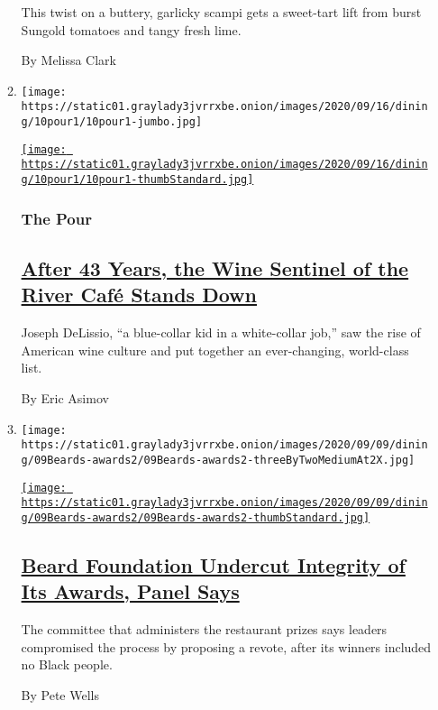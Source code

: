 \begin{enumerate}
\begin{enumerate}
    This twist on a buttery, garlicky scampi gets a sweet-tart lift from
    burst Sungold tomatoes and tangy fresh lime.

    By Melissa Clark
  \item
    \texttt{[image: https://static01.graylady3jvrrxbe.onion/images/2020/09/16/dining/10pour1/10pour1-jumbo.jpg]}

    \href{/2020/09/10/dining/drinks/river-cafe-wine-joseph-delissio.html}{\texttt{[image: https://static01.graylady3jvrrxbe.onion/images/2020/09/16/dining/10pour1/10pour1-thumbStandard.jpg]}}

    \hypertarget{the-pour}{%
    \subsubsection{The Pour}\label{the-pour}}

    \hypertarget{after-43-years-the-wine-sentinel-of-the-river-cafuxe9-stands-down}{%
    \subsection{\texorpdfstring{\href{/2020/09/10/dining/drinks/river-cafe-wine-joseph-delissio.html}{After
    43 Years, the Wine Sentinel of the River Café Stands
    Down}}{After 43 Years, the Wine Sentinel of the River Café Stands Down}}\label{after-43-years-the-wine-sentinel-of-the-river-cafuxe9-stands-down}}

    Joseph DeLissio, ``a blue-collar kid in a white-collar job,'' saw
    the rise of American wine culture and put together an ever-changing,
    world-class list.

    By Eric Asimov
  \item
    \texttt{[image: https://static01.graylady3jvrrxbe.onion/images/2020/09/09/dining/09Beards-awards2/09Beards-awards2-threeByTwoMediumAt2X.jpg]}

    \href{/2020/09/09/dining/james-beard-awards.html}{\texttt{[image: https://static01.graylady3jvrrxbe.onion/images/2020/09/09/dining/09Beards-awards2/09Beards-awards2-thumbStandard.jpg]}}

    \hypertarget{beard-foundation-undercut-integrity-of-its-awards-panel-says}{%
    \subsection{\texorpdfstring{\href{/2020/09/09/dining/james-beard-awards.html}{Beard
    Foundation Undercut Integrity of Its Awards, Panel
    Says}}{Beard Foundation Undercut Integrity of Its Awards, Panel Says}}\label{beard-foundation-undercut-integrity-of-its-awards-panel-says}}

    The committee that administers the restaurant prizes says leaders
    compromised the process by proposing a revote, after its winners
    included no Black people.

    By Pete Wells
  \end{enumerate}
\end{enumerate}

